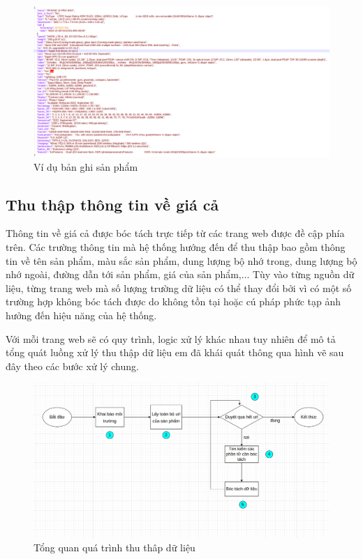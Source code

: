 \documentclass[../DoAn.tex]{subfiles}
\begin{document}
\begin{figure}[H]
    \centering
    \includegraphics[scale=0.3]{Hinhve/info_product_example.png}
    \caption{Ví dụ bản ghi sản phẩm}
    \label{fig:my_label2}
\end{figure}

\subsection{Thu thập thông tin về giá cả}
\label{subsection:4.2.2.1}
Thông tin về giá cả được bóc tách trực tiếp từ các trang web được đề cập phía trên. Các trường thông tin mà hệ thống hướng đến để thu thập bao gồm thông tin về tên sản phẩm, màu sắc sản phẩm, dung lượng bộ nhớ trong, dung lượng bộ nhớ ngoài, đường dẫn tới sản phẩm, giá của sản phẩm,... Tùy vào từng nguồn dữ liệu, từng trang web mà số lượng trường dữ liệu có thể thay đổi bởi vì có một số trường hợp không bóc tách được do không tồn tại hoặc cú pháp phức tạp ảnh hưởng đến hiệu năng của hệ thống. 

Với mỗi trang web sẽ có quy trình, logic xử lý khác nhau tuy nhiên để mô tả tổng quát luồng xử lý thu thập dữ liệu em đã khái quát thông qua hình vẽ sau đây theo các bước xử  lý chung.

\begin{figure}[H]
    \centering
    \includegraphics[scale=0.35]{Hinhve/overview_crawl.png}
    \caption{Tổng quan quá trình thu thâp dữ liệu}
    \label{fig:my_label2}
\end{figure}
\end{document}
